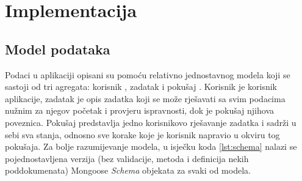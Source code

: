 \documentclass[times, utf8, diplomski, numeric]{fer}
\begin{document}















\chapter{Implementacija}


\section{Model podataka} \label{sec:data}

Podaci u aplikaciji opisani su pomoću relativno jednostavnog modela koji se sastoji od tri agregata: korisnik , zadatak  i pokušaj .
Korisnik je korisnik aplikacije, zadatak je opis zadatka koji se može rješavati sa svim podacima nužnim za njegov početak i provjeru ispravnosti, dok je pokušaj njihova poveznica.
Pokušaj predstavlja jedno korisnikovo rješavanje zadatka i sadrži u sebi sva stanja, odnosno sve korake koje je korisnik napravio u okviru tog pokušaja.
Za bolje razumijevanje modela, u isječku koda \ref{lst:schema} nalazi se pojednostavljena verzija (bez validacije, metoda i definicija nekih poddokumenata) Mongoose \emph{Schema} objekata za svaki od modela.
\end{document}
